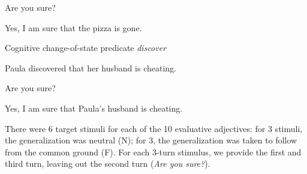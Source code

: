 \documentclass[11pt,fleqn]{article}
\newcommand{\6}{\mbox{$[\hspace*{-.6mm}[$}}
\newcommand{\9}{\mbox{$]\hspace*{-.6mm}]$}}
\begin{document}
\begin{exe}
\begin{xlist}
\begin{xlist}
 Are you sure?

 Yes, I am sure that the pizza is gone.
\end{xlist}

\ex Cognitive change-of-state predicate {\em discover}
\begin{xlist}
 Paula discovered that her husband is cheating.

 Are you sure?

 Yes, I am sure that Paula's husband is cheating.
\end{xlist}
\end{xlist}
\end{exe}

There were 6 target stimuli for each of the 10 evaluative adjectives: for 3 stimuli, the generalization was neutral (N); for 3, the generalization was taken to follow from the common ground (F). For each 3-turn stimulus, we provide the first and third turn, leaving out the second turn ({\em Are you sure?}).
\end{document}
